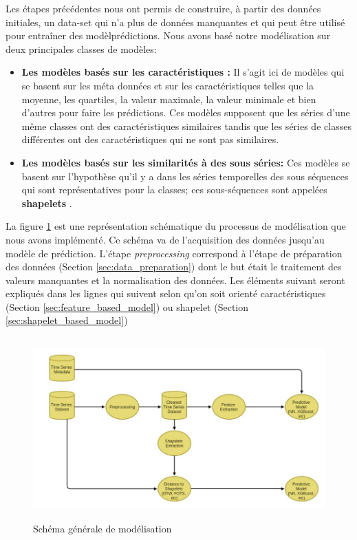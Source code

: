 Les étapes précédentes nous ont permis de construire, à partir des données initiales, un data-set qui n'a plus de données manquantes et qui peut être utilisé pour entraîner des modèlprédictions. Nous avons basé notre modélisation sur deux principales classes de modèles:
\begin{itemize}
    \item \textbf{Les modèles basés sur les caractéristiques :} Il s'agit ici de modèles qui se basent sur les méta données et sur les caractéristiques telles que la moyenne, les quartiles, la valeur maximale, la valeur minimale et bien d'autres pour faire les prédictions. Ces modèles supposent que les séries d'une même classes ont des caractéristiques similaires tandis que les séries de classes différentes ont des caractéristiques qui ne sont pas similaires.
    \item \textbf{Les modèles basés sur les similarités à des sous séries:} Ces modèles se basent sur l'hypothèse qu'il y a dans les séries temporelles des sous séquences qui sont représentatives pour la classes; ces sous-séquences sont appelées \textbf{shapelets} \citep{ye2009time}.
\end{itemize}
La figure \ref{fig:modeling_shema} est une représentation schématique du processus de modélisation que nous avons implémenté. Ce schéma va de l'acquisition des données jusqu'au modèle de prédiction. L'étape \textit{preprocessing} correspond à l'étape de préparation des données (Section \ref{sec:data_preparation}) dont le but était le traitement des valeurs manquantes et la normalisation des données. Les éléments suivant seront expliqués dans les lignes qui suivent selon qu'on soit orienté caractéristiques (Section \ref{sec:feature_based_model}) ou shapelet (Section \ref{sec:shapelet_based_model})

\begin{figure}[!h]
    \centering
    \includegraphics[width=12cm,height=7cm]{report/figures/modeling-schema.jpg}
    \caption{Schéma générale de modélisation}
    \label{fig:modeling_shema}
\end{figure}


